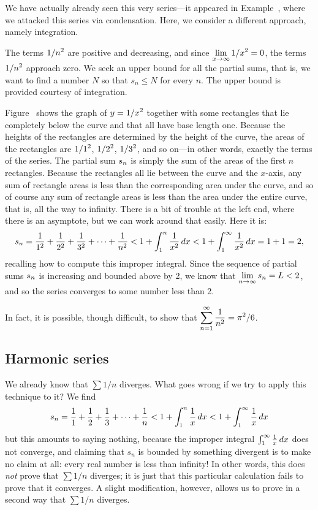 \begin{solution}
  We have actually already seen this very series---it appeared in
  Example~, where we attacked this series
  via condensation.  Here, we consider a different approach, namely
  integration.

  The terms $\displaystyle 1/n^2$ are positive and decreasing, and since
  $\displaystyle\lim_{x\to\infty} 1/x^2=0$, the terms $\displaystyle 1/n^2$ approach
  zero. We seek an upper bound for all the partial sums, that is, we
  want to find a number $N$ so that $s_n\le N$ for every $n$. The
  upper bound is provided courtesy of integration.

  Figure~ shows the
  graph of $\displaystyle y=1/x^2$ together with some rectangles that lie
  completely below the curve and that all have base length
  one. Because the heights of the rectangles are determined by the
  height of the curve, the areas of the rectangles are $\displaystyle 1/1^2$,
  $\displaystyle 1/2^2$, $\displaystyle 1/3^2$, and so on---in other words, exactly the
  terms of the series. The partial sum $\displaystyle s_n$ is simply the sum of
  the areas of the first $n$ rectangles. Because the rectangles all
  lie between the curve and the $x$-axis, any sum of rectangle areas
  is less than the corresponding area under the curve, and so of
  course any sum of rectangle areas is less than the area under the
  entire curve, that is, all the way to infinity.  There is a bit of
  trouble at the left end, where there is an asymptote, but we can
  work around that easily. Here it is:
$$
  s_n={1\over 1^2}+{1\over 2^2}+{1\over 3^2}+\cdots+{1\over n^2}
  < 1 + \int_1^n {1\over x^2}\,dx < 1+\int_1^\infty {1\over x^2}\,dx 
  =1+1=2,
$$
recalling how to compute this improper integral. Since the sequence of partial
sums $\displaystyle s_n$ is increasing and bounded above by 2, we know that 
$\displaystyle\lim_{n\to\infty}s_n=L<2$, and so the series converges to some
number less than 2.
\end{solution}

In fact, it is possible, though difficult, to show that $\displaystyle
\sum_{n=1}^\infty \frac{1}{n^2} = \pi^2/6$.

\subsection{Harmonic series}
\label{subsection:harmonic-series-by-integrating}

We already know that $\sum 1/n$ diverges. What goes wrong if we try to
apply this technique to it? We find
$$
  s_n={1\over 1}+{1\over 2}+{1\over 3}+\cdots+{1\over n}
  < 1 + \int_1^n {1\over x}\,dx < 1+\int_1^\infty {1\over x}\,dx 
$$
but this amounts to saying nothing, because the improper integral
$\int_1^\infty {1\over x}\,dx$ does not converge, and claiming that
$s_n$ is bounded by something divergent is to make no claim at all:
every real number is less than infinity!  In other words, this does
{\em not\/} prove that $\sum 1/n$ diverges; it is just that this
particular calculation fails to prove that it converges. A slight
modification, however, allows us to prove in a second way that $\sum
1/n$ diverges.

